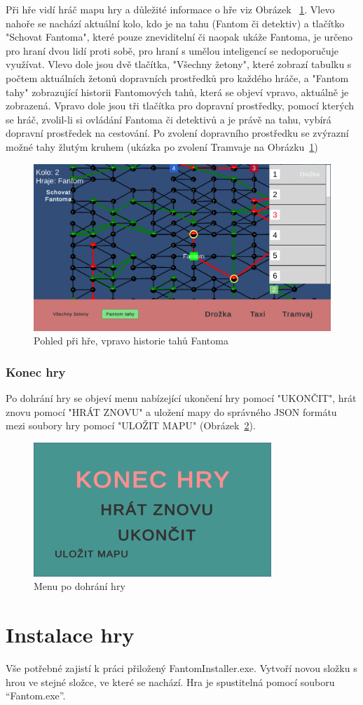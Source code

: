 Při hře vidí hráč mapu hry a důležité informace o hře viz Obrázek~ \ref{fig:ingame_view}. Vlevo nahoře se nachází aktuální kolo, kdo je na tahu (Fantom či detektiv) a tlačítko "Schovat Fantoma", které pouze zneviditelní či naopak ukáže Fantoma, je určeno pro hraní dvou lidí proti sobě, pro hraní s umělou inteligencí se nedoporučuje využívat. Vlevo dole jsou dvě tlačítka, "Všechny žetony", které zobrazí tabulku s počtem aktuálních žetonů dopravních prostředků pro každého hráče, a "Fantom tahy" zobrazující historii Fantomových tahů, která se objeví vpravo, aktuálně je zobrazená. Vpravo dole jsou tři tlačítka pro dopravní prostředky, pomocí kterých se hráč, zvolil-li si ovládání Fantoma či detektivů a je právě na tahu, vybírá dopravní prostředek na cestování. Po zvolení dopravního prostředku se zvýrazní možné tahy žlutým kruhem (ukázka po zvolení Tramvaje na Obrázku~\ref{fig:ingame_view})

\begin{figure}[h]
  \centering
  \includegraphics[width=1\textwidth]{ingame_view.png}
  \caption{Pohled při hře, vpravo historie tahů Fantoma}
  \label{fig:ingame_view}
\end{figure}
\clearpage
\subsubsection{Konec hry}

Po dohrání hry se objeví menu nabízející ukončení hry pomocí "UKONČIT", hrát znovu pomocí "HRÁT ZNOVU" a uložení mapy do správného JSON formátu mezi soubory hry pomocí "ULOŽIT MAPU" (Obrázek~\ref{fig:end_menu}).

\begin{figure}[h]
  \centering
  \includegraphics[width=0.8\textwidth]{end_menu.png}
  \caption{Menu po dohrání hry}
  \label{fig:end_menu}
\end{figure}

\section{Instalace hry}

Vše potřebné zajistí k práci přiložený FantomInstaller.exe. Vytvoří novou složku s hrou ve stejné složce, ve které se nachází. Hra je spustitelná pomocí souboru ``Fantom.exe''.
